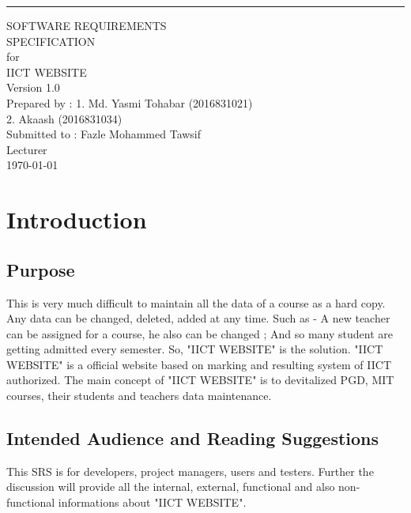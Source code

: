 \documentclass{scrreprt}
\date{}
\def\myversion{1.0 }
\begin{document}
\begin{flushright}
    \rule{16cm}{5pt}\vskip1cm
    \begin{bfseries}
        \Huge{SOFTWARE REQUIREMENTS\\ SPECIFICATION}\\
        \vspace{1.5cm}
        for\\
        \vspace{1.5cm}
        IICT WEBSITE\\
        \vspace{1.5cm}
        \LARGE{Version \myversion}\\
        \vspace{1.5cm}
        Prepared by : 1. Md. Yasmi Tohabar (2016831021)\\
        2. Akaash (2016831034)\\
        \vspace{1.5cm}
        Submitted to : Fazle Mohammed Tawsif \\Lecturer\\
        \vspace{1.5cm}
        \today\\
    \end{bfseries}
\end{flushright}

\tableofcontents

\chapter{Introduction}

\section{Purpose}
This is very much difficult to maintain all the data of a course as a hard copy. Any data can be changed, deleted, added at any time. Such as - A new teacher can be assigned for a course, he also can be changed ; And so many student are getting admitted every semester. So, "IICT WEBSITE" is the solution. "IICT WEBSITE" is a official website based on marking and resulting system of IICT authorized. The main concept of "IICT WEBSITE" is to devitalized PGD, MIT courses, their students and teachers data maintenance. 

\section{Intended Audience and Reading Suggestions}
This SRS is for developers, project managers, users and testers. Further the discussion will provide all the internal, external, functional and also non-functional informations about "IICT WEBSITE".
\end{document}

